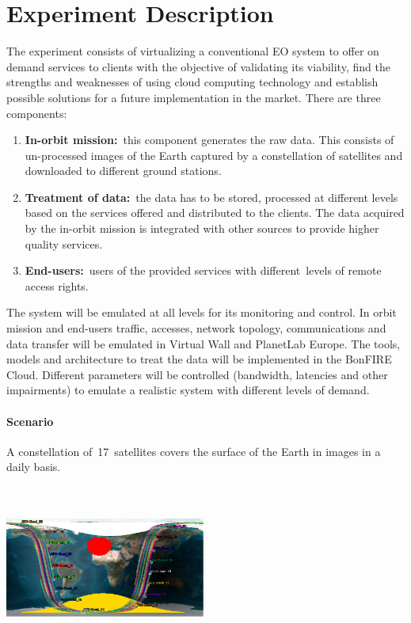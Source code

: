\documentclass[a4paper]{article}
\newcounter{saveenum}
\newcommand\liststyleLFOxxxii{%
\renewcommand\theenumi{\alph{enumi}}
\renewcommand\theenumii{\alph{enumii}}
\renewcommand\theenumiii{\roman{enumiii}}
\renewcommand\theenumiv{\arabic{enumiv}}
\renewcommand\labelenumi{\theenumi)}
\renewcommand\labelenumii{\theenumii.}
\renewcommand\labelenumiii{\theenumiii.}
\renewcommand\labelenumiv{\theenumiv.}
}
\begin{document}
\bigskip

\section[Experiment Description]{Experiment Description}
\hypertarget{Toc378868686}{}
\bigskip

The experiment consists of virtualizing a conventional EO system to
offer on demand services to clients with the objective of validating
its viability, find the strengths and weaknesses of using cloud
computing technology and establish possible solutions for a future
implementation in the market. There are three components:

\liststyleLFOxxxii
\setcounter{saveenum}{\value{enumi}}
\begin{enumerate}
\setcounter{enumi}{\value{saveenum}}
\item \textbf{In-orbit mission:}\ this component generates the raw data.
This consists of un-processed images of the Earth captured by a
constellation of satellites and downloaded to different ground
stations.\ 
\item \textbf{Treatment of data:}\ the data has to be stored, processed
at different levels based on the services offered and distributed to
the clients. The data acquired by the in-orbit mission is integrated
with other sources to provide higher quality services.
\item \textbf{End-users:}\ users of the provided services with
different\ levels of remote access rights.\ 
\end{enumerate}
The system will be emulated at all levels for its monitoring and
control. In orbit mission and end-users traffic, accesses, network
topology, communications and data transfer will be emulated in Virtual
Wall and PlanetLab Europe. The tools, models and architecture to treat
the data will be implemented in the BonFIRE Cloud. Different parameters
will be controlled (bandwidth, latencies and other impairments) to
emulate a realistic system with different levels of demand.\ 


\bigskip

\paragraph{Scenario}
A constellation of\ 17\ satellites covers the surface of the Earth in
images in a daily basis.\ 


\bigskip

{\centering 
\includegraphics[width=2.59145in,height=2.14443in]{out-img6.png} \par}
\end{document}
